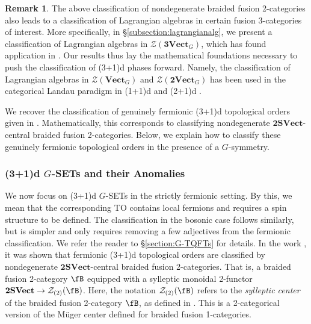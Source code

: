 \documentclass[11pt,reqno]{amsart}
\newcommand{\tSVect}{\mathbf{2SVect}}
\newcommand{\cZ}{\mathcal{Z}}
\numberwithin{equation}{section}
\theoremstyle{plain}
\theoremstyle{definition}
\newtheorem{rem}[equation]{Remark}
\begin{document}
\begin{rem}
The above classification of nondegenerate braided fusion 2-categories also leads to a classification of Lagrangian algebras in certain fusion 3-categories of interest. More specifically, in \S\ref{subsection:lagrangianalg}, we present a classification of Lagrangian algebras in $\cZ(\mathbf{3Vect}_G)$, which has found application in \cite{Antinucci:2025fjp}. Our results thus lay the mathematical foundations necessary to push the classification of (3+1)d phases forward. Namely, the classification of Lagrangian algebras in $\cZ(\mathbf{Vect}_G)$ and $\cZ(\mathbf{2Vect}_G)$ has been used in the categorical Landau paradigm in (1+1)d and (2+1)d \cite{Bhardwaj:2023idu,Bhardwaj:2023fca,Bhardwaj:2024qrf,Bhardwaj:2024qiv,Bhardwaj:2025piv,Wen:2023otf,Wen:2024qsg,Wen:2025thg}.
\end{rem}

We recover the classification of genuinely fermionic (3+1)d topological orders given in \cite[Corollary V.4]{JF}. Mathematically, this corresponds to classifying nondegenerate $\mathbf{2SVect}$-central braided fusion 2-categories. Below, we explain how to classify these genuinely fermionic topological orders in the presence of a $G$-symmetry.

\subsubsection{(3+1)d $G$-SETs and their Anomalies} \label{subsub:classifyingSET}

We now focus on (3+1)d $G$-SETs in the strictly fermionic setting. By this, we mean that the corresponding TO contains local fermions and requires a spin structure to be defined. The classification in the bosonic case follows similarly, but is simpler and only requires removing a few adjectives from the fermionic classification. We refer the reader to \S\ref{section:G-TQFTs} for details.
In the work \cite{JF}, it was shown that fermionic (3+1)d topological orders are classified by nondegenerate $\mathbf{2SVect}$-central braided fusion 2-categories. That is, a braided fusion 2-category $\fB$ equipped with a sylleptic monoidal 2-functor $\tSVect \to \cZ_{(2)}(\fB)$. Here, the notation $\cZ_{(2)}(\fB)$ refers to the \textit{sylleptic center} of the braided fusion 2-category $\fB$, as defined in \cite{Cr}. This is a 2-categorical version of the M\"uger center defined for braided fusion 1-categories.
\end{document}
